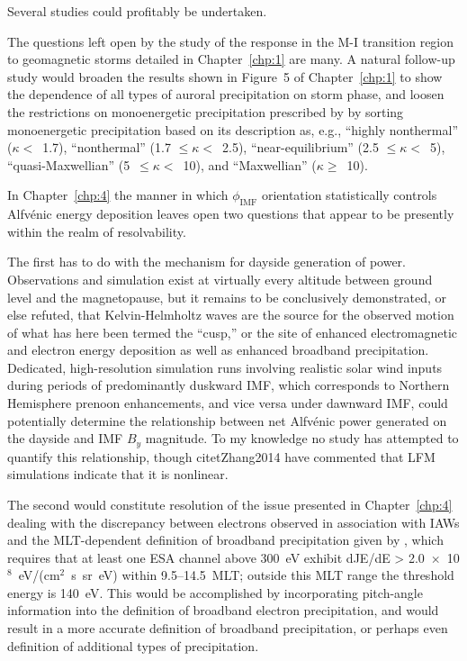   Several studies could profitably be undertaken. 

  The questions left open by the study of the \Alfic response in the
  M-I transition region to geomagnetic storms detailed in
  Chapter~\ref{chp:1} are many. A natural follow-up study would
  broaden the results shown in Figure~5 of Chapter~\ref{chp:1} to show
  the dependence of all types of auroral precipitation on storm phase,
  and loosen the restrictions on monoenergetic precipitation
  prescribed by \citet{McIntosh2014} by sorting monoenergetic
  precipitation based on its description as, e.g., ``highly
  nonthermal'' ($\kappa <$~1.7), ``nonthermal'' (1.7 $\leq \kappa
  <$~2.5), ``near-equilibrium'' (2.5 $\leq \kappa <$~5),
  ``quasi-Maxwellian'' (5~$\leq \kappa <$~10), and ``Maxwellian''
  ($\kappa \geq$~10).

  In Chapter~\ref{chp:4} the manner in which $\phi_{\textrm{IMF}}$
  orientation statistically controls Alfv\'{e}nic energy deposition
  leaves open two questions that appear to be presently within the realm
  of resolvability.

  The first has to do with the mechanism for dayside generation of
  \Alfic power. Observations and simulation exist at virtually every
  altitude between ground level and the magnetopause, but it remains
  to be conclusively demonstrated, or else refuted, that
  Kelvin-Helmholtz waves are the source for the observed motion of
  what has here been termed the ``\Alfic cusp,'' or the site of
  enhanced \Alfic electromagnetic and electron energy deposition as
  well as enhanced broadband precipitation. Dedicated, high-resolution
  simulation runs involving realistic solar wind inputs during periods
  of predominantly duskward IMF, which corresponds to Northern
  Hemisphere prenoon \Alfic enhancements, and vice versa under
  dawnward IMF, could potentially determine the relationship between
  net Alfv\'{e}nic power generated on the dayside and IMF $B_y$
  magnitude. To my knowledge no study has attempted to quantify this
  relationship, though citet{Zhang2014} have commented that LFM
  simulations indicate that it is nonlinear.

  The second would constitute resolution of the issue presented in
  Chapter~\ref{chp:4} dealing with the discrepancy between electrons
  observed in association with IAWs and the MLT-dependent definition
  of broadband precipitation given by \citet{Newell2009}, which
  requires that at least one ESA channel above 300~eV exhibit dJE/dE >
  2.0~$\times$~10$^8$~eV/(cm$^2$~s~sr~eV) within 9.5--14.5~MLT;
  outside this MLT range the threshold energy is 140~eV. This would be
  accomplished by incorporating pitch-angle information into the
  definition of broadband electron precipitation, and would result in
  a more accurate definition of broadband precipitation, or perhaps
  even definition of additional types of precipitation.

